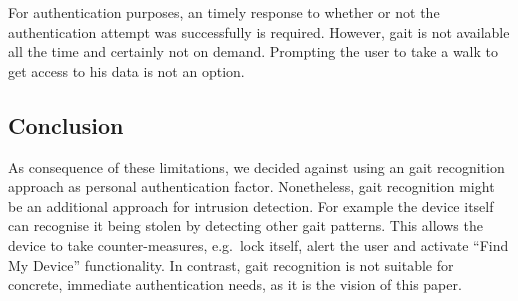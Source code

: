 For authentication purposes, an timely response to whether or not the authentication attempt was successfully is required. However, gait is not available all the time and certainly not on demand. Prompting the user to take a walk to get access to his data is not an option.

\subsection{Conclusion}
As consequence of these limitations, we decided against using an gait recognition approach as personal authentication factor. Nonetheless, gait recognition might be an additional approach for intrusion detection. For example the device itself can recognise it being stolen by detecting other gait patterns. This allows the device to take counter-measures, e.g.\ lock itself, alert the user and activate ``Find My Device'' functionality.
In contrast, gait recognition is not suitable for concrete, immediate authentication needs, as it is the vision of this paper.